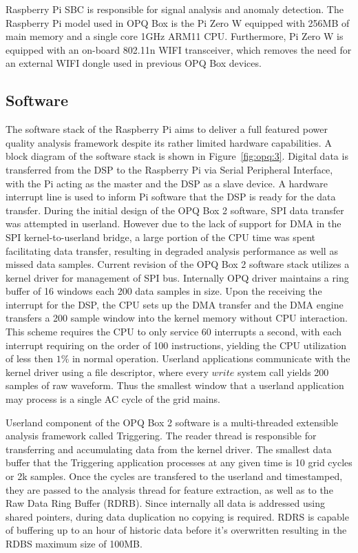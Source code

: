 Raspberry Pi SBC is responsible for signal analysis and anomaly detection.
The Raspberry Pi model used in OPQ Box is the Pi Zero W equipped with 256MB of main memory and a single core 1GHz ARM11 CPU. Furthermore, Pi Zero W is equipped with an on-board 802.11n WIFI transceiver, which removes the need for an external WIFI dongle used in previous OPQ Box devices.
\subsection{Software}\label{subsec:software}
The software stack of the Raspberry Pi aims to deliver a full featured power quality analysis framework despite its rather limited hardware capabilities.
A block diagram of the software stack is shown in Figure~\ref{fig:opq:3}.
Digital data is transferred from the DSP to the Raspberry Pi via Serial Peripheral Interface, with the Pi acting as the master and the DSP as a slave device.
A hardware interrupt line is used to inform Pi software that the DSP is ready for the data transfer.
During the initial design of the OPQ Box 2 software, SPI data transfer was attempted in userland.
However due to the lack of support for DMA in the SPI kernel-to-userland bridge, a large portion of the CPU time was spent facilitating data transfer, resulting in degraded analysis performance as well as missed data samples.
Current revision of the OPQ Box 2 software stack utilizes a kernel driver for management of SPI bus.
Internally OPQ driver maintains a ring buffer of 16 windows each 200 data samples in size.
Upon the receiving the interrupt for the DSP, the CPU sets up the DMA transfer and the DMA engine transfers a 200 sample window into the kernel memory without CPU interaction.
This scheme requires the CPU to only service 60 interrupts a second, with each interrupt requiring on the order of 100 instructions, yielding the CPU utilization of less then $1\%$ in normal operation.
Userland applications communicate with the kernel driver using a file descriptor, where every $write$ system call yields 200 samples of raw waveform.
Thus the smallest window that a userland application may process is a single AC cycle of the grid mains.

Userland component of the OPQ Box 2 software is a multi-threaded extensible analysis framework called Triggering.
The reader thread is responsible for transferring and accumulating data from the kernel driver.
The smallest data buffer that the Triggering application processes at any given time is 10 grid cycles or 2k samples.
Once the cycles are transfered to the userland and timestamped, they are passed to the analysis thread for feature extraction, as well as to the Raw Data Ring Buffer (RDRB).
Since internally all data is addressed using shared pointers, during data duplication no copying is required.
RDRS is capable of buffering up to an hour of historic data before it's overwritten resulting in the RDBS maximum size of 100MB.

